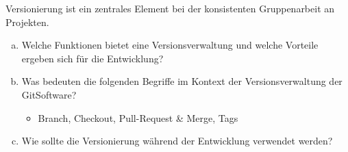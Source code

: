         \begin{aufgabe}
            Versionierung ist ein zentrales Element bei der konsistenten Gruppenarbeit an Projekten.
            \\[-.7cm]\begin{enumerate}[(a)]
                \setlength\itemsep{0.1px}
                \item Welche Funktionen bietet eine Versionsverwaltung und welche Vorteile ergeben sich für die Entwicklung?
                \item Was bedeuten die folgenden Begriffe im Kontext der Versionsverwaltung der GitSoftware?
                \\[-.7cm]\begin{itemize}
                    \setlength\itemsep{0.1px}
                    \item Branch, Checkout, Pull-Request \& Merge, Tags
                \end{itemize}
                \item Wie sollte die Versionierung während der Entwicklung verwendet werden?
            \end{enumerate}
        \end{aufgabe}
    
